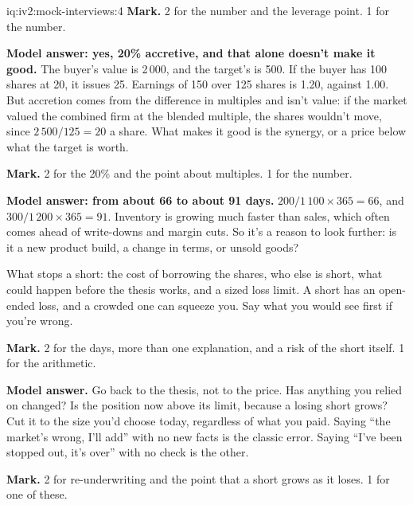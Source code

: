 \begin{solution}{iq:iv2:mock-interviews:4}
\textbf{Mark.} 2 for the number and the leverage point. 1 for the number.

\ivstop
\textbf{Model answer: yes, 20\% accretive, and that alone doesn't make it good.} The buyer's value is 2\,000, and the target's is 500. If the buyer has 100 shares at 20, it issues 25. Earnings of 150 over 125 shares is 1.20, against 1.00. But accretion comes from the difference in multiples and isn't value: if the market valued the combined firm at the blended multiple, the shares wouldn't move, since $2\,500/125 = 20$ a share. What makes it good is the synergy, or a price below what the target is worth.

\textbf{Mark.} 2 for the 20\% and the point about multiples. 1 for the number.

\ivstop
\textbf{Model answer: from about 66 to about 91 days.} $200/1\,100 \times 365 = 66$, and $300/1\,200 \times 365 = 91$. Inventory is growing much faster than sales, which often comes ahead of write-downs and margin cuts. So it's a reason to look further: is it a new product build, a change in terms, or unsold goods?

What stops a short: the cost of borrowing the shares, who else is short, what could happen before the thesis works, and a sized loss limit. A short has an open-ended loss, and a crowded one can squeeze you. Say what you would see first if you're wrong.

\textbf{Mark.} 2 for the days, more than one explanation, and a risk of the short itself. 1 for the arithmetic.

\ivstop
\textbf{Model answer.} Go back to the thesis, not to the price. Has anything you relied on changed? Is the position now above its limit, because a losing short grows? Cut it to the size you'd choose today, regardless of what you paid. Saying ``the market's wrong, I'll add'' with no new facts is the classic error. Saying ``I've been stopped out, it's over'' with no check is the other.

\textbf{Mark.} 2 for re-underwriting and the point that a short grows as it loses. 1 for one of these.


\end{solution}
